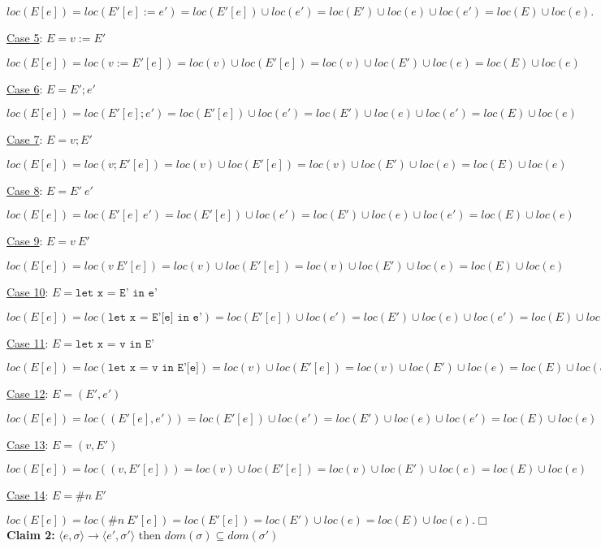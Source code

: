 \documentclass[10pt]{article}
\begin{document}
\begin{enumerate} [(a)]
    $loc(E[e]) = loc(E'[e]:=e') = loc(E'[e]) \cup loc(e') = loc(E') \cup loc(e) \cup loc(e') = loc(E) \cup loc(e).$

    \underline{Case 5}: $E = v:=E'$

    $loc(E[e]) = loc(v:=E'[e]) = loc(v) \cup loc(E'[e]) = loc(v) \cup loc(E') \cup loc(e) = loc(E) \cup loc(e)$

    \underline{Case 6}: $E = E';e'$

    $loc(E[e]) = loc(E'[e];e') = loc(E'[e]) \cup loc(e')= loc(E') \cup loc(e) \cup loc(e') = loc(E) \cup loc(e)$

    \underline{Case 7}: $E = v;E'$

    $loc(E[e]) = loc(v;E'[e]) = loc(v) \cup loc(E'[e])= loc(v) \cup loc(E') \cup loc(e) = loc(E) \cup loc(e)$

    \underline{Case 8}: $E = E'~e'$

    $loc(E[e]) = loc(E'[e]~e') = loc(E'[e]) \cup loc(e')= loc(E') \cup loc(e) \cup loc(e')= loc(E) \cup loc(e)$

    \underline{Case 9}: $E = v~E'$

    $loc(E[e]) = loc(v~E'[e]) = loc(v) \cup loc(E'[e]) = loc(v) \cup loc(E') \cup loc(e)= loc(E) \cup loc(e)$

    \underline{Case 10}: $E = \texttt{let x = E' in e'}$

    $loc(E[e]) = loc(\texttt{let x = E'[e] in e'}) = loc(E'[e]) \cup loc(e') = loc(E') \cup loc(e) \cup loc(e')= loc(E) \cup loc(e)$

    \underline{Case 11}: $E = \texttt{let x = v in E'}$

    $loc(E[e]) = loc(\texttt{let x = v in E'[e]}) = loc(v) \cup loc(E'[e]) = loc(v) \cup loc(E') \cup loc(e) = loc(E) \cup loc(e)$

    \underline{Case 12}: $E = (E',e')$

    $loc(E[e]) = loc((E'[e], e')) = loc(E'[e]) \cup loc(e')= loc(E') \cup loc(e) \cup loc(e') = loc(E) \cup loc(e)$

    \underline{Case 13}: $E = (v,E')$

    $loc(E[e]) = loc((v,E'[e])) = loc(v) \cup loc(E'[e]) = loc(v) \cup loc(E') \cup loc(e) = loc(E) \cup loc(e)$

    \underline{Case 14}: $E = \#n~E'$

    $loc(E[e]) = loc(\#n~E'[e]) = loc(E'[e]) = loc(E') \cup loc(e) = loc(E) \cup loc(e).\Box$\\

    \textbf{Claim 2:}  $\langle e, \sigma \rangle \rightarrow \langle e', \sigma' \rangle$ then $dom(\sigma) \subseteq dom(\sigma')$


\end{enumerate}
\end{document}
